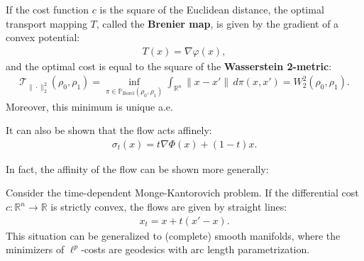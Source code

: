     \begin{example}
        If the cost function $c$ is the square of the Euclidean distance, the optimal transport mapping $T$, called the \textbf{Brenier map}, is given by the gradient of a convex potential:
        \begin{gather}
            T(x) = \nabla\varphi(x),
        \end{gather}
        and the optimal cost is equal to the square of the \textbf{Wasserstein 2-metric}:
        \begin{gather}
            \mathcal{T}_{\|\cdot\|_2^2}(\rho_0,\rho_1) = \inf_{\pi\in\mathbb{P}_\text{Borel}(\rho_0,\rho_1)}\int_{\mathbb{R}^n}\|x-x'\|\,d\pi(x,x')=W^2_2(\rho_0,\rho_1).
        \end{gather}
        Moreover, this minimum is unique a.e.

        It can also be shown that the flow acts affinely:
        \begin{gather}
            \sigma_t(x) = t\nabla\Phi(x) + (1-t)x.
        \end{gather}
    \end{example}

    In fact, the affinity of the flow can be shown more generally:
    \begin{property}
        Consider the time-dependent Monge-Kantorovich problem. If the differential cost $c:\mathbb{R}^n\rightarrow\mathbb{R}$ is strictly convex, the flows are given by straight lines:
        \begin{gather}
            x_t = x + t(x'-x).
        \end{gather}
        This situation can be generalized to (complete) smooth manifolds, where the minimizers of $\ell^p$-costs are geodesics with arc length parametrization.
    \end{property}

